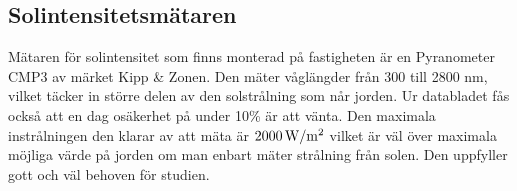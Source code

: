 \subsection{Solintensitetsmätaren}\label{subsec:sunmeter}
Mätaren för solintensitet som finns monterad på fastigheten är en Pyranometer CMP3 av märket Kipp \& Zonen. Den mäter våglängder från 300 till 2800 nm, vilket täcker in större delen av den solstrålning som når jorden. Ur databladet fås också att en dag osäkerhet på under 10\% är att vänta. Den maximala instrålningen den klarar av att mäta är $\unit[2000]{W/m^2}$ vilket är väl över maximala möjliga värde på jorden om man enbart mäter strålning från solen. Den uppfyller gott och väl behoven för studien.\cite{datasheet_sun}



